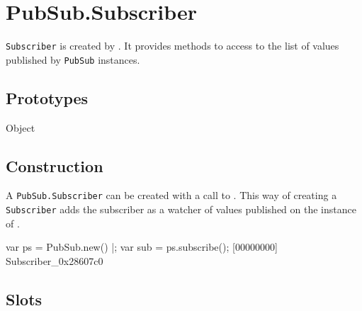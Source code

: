 
\section{PubSub.Subscriber}

\lstinline|Subscriber| is created by .  It
provides methods to access to the list of values published by
\lstinline|PubSub| instances.

\subsection{Prototypes}

\begin{refObjects}
\item[Object]
\end{refObjects}

\subsection{Construction}

A \lstinline|PubSub.Subscriber| can be created with a call to
.  This way of creating a \lstinline|Subscriber|
adds the subscriber as a watcher of values published on the instance of
.

\begin{urbiscript}[firstnumber=1]
var ps = PubSub.new() |;
var sub = ps.subscribe();
[00000000] Subscriber_0x28607c0
\end{urbiscript}

\subsection{Slots}

